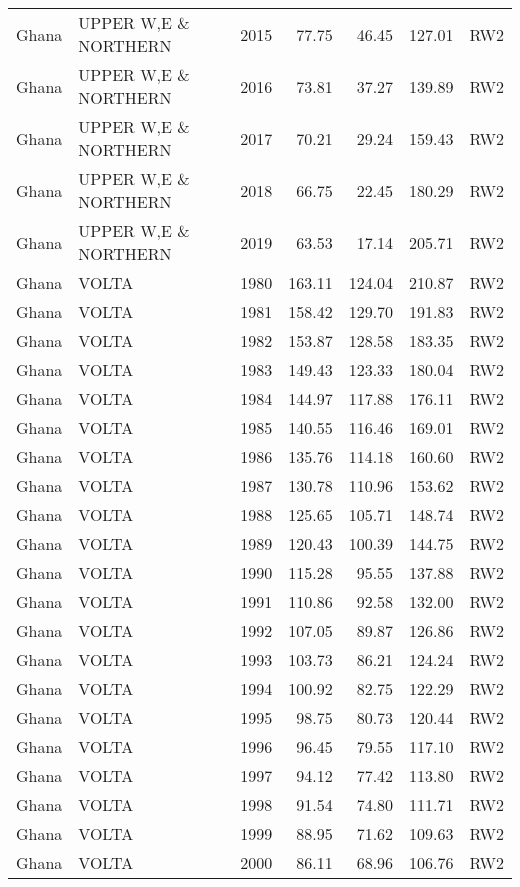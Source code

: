 \begin{longtable}{lllrrrl}
  Ghana & UPPER W,E \& NORTHERN & 2015 & 77.75 & 46.45 & 127.01 & RW2 \\ 
  Ghana & UPPER W,E \& NORTHERN & 2016 & 73.81 & 37.27 & 139.89 & RW2 \\ 
  Ghana & UPPER W,E \& NORTHERN & 2017 & 70.21 & 29.24 & 159.43 & RW2 \\ 
  Ghana & UPPER W,E \& NORTHERN & 2018 & 66.75 & 22.45 & 180.29 & RW2 \\ 
  Ghana & UPPER W,E \& NORTHERN & 2019 & 63.53 & 17.14 & 205.71 & RW2 \\ 
  Ghana & VOLTA & 1980 & 163.11 & 124.04 & 210.87 & RW2 \\ 
  Ghana & VOLTA & 1981 & 158.42 & 129.70 & 191.83 & RW2 \\ 
  Ghana & VOLTA & 1982 & 153.87 & 128.58 & 183.35 & RW2 \\ 
  Ghana & VOLTA & 1983 & 149.43 & 123.33 & 180.04 & RW2 \\ 
  Ghana & VOLTA & 1984 & 144.97 & 117.88 & 176.11 & RW2 \\ 
  Ghana & VOLTA & 1985 & 140.55 & 116.46 & 169.01 & RW2 \\ 
  Ghana & VOLTA & 1986 & 135.76 & 114.18 & 160.60 & RW2 \\ 
  Ghana & VOLTA & 1987 & 130.78 & 110.96 & 153.62 & RW2 \\ 
  Ghana & VOLTA & 1988 & 125.65 & 105.71 & 148.74 & RW2 \\ 
  Ghana & VOLTA & 1989 & 120.43 & 100.39 & 144.75 & RW2 \\ 
  Ghana & VOLTA & 1990 & 115.28 & 95.55 & 137.88 & RW2 \\ 
  Ghana & VOLTA & 1991 & 110.86 & 92.58 & 132.00 & RW2 \\ 
  Ghana & VOLTA & 1992 & 107.05 & 89.87 & 126.86 & RW2 \\ 
  Ghana & VOLTA & 1993 & 103.73 & 86.21 & 124.24 & RW2 \\ 
  Ghana & VOLTA & 1994 & 100.92 & 82.75 & 122.29 & RW2 \\ 
  Ghana & VOLTA & 1995 & 98.75 & 80.73 & 120.44 & RW2 \\ 
  Ghana & VOLTA & 1996 & 96.45 & 79.55 & 117.10 & RW2 \\ 
  Ghana & VOLTA & 1997 & 94.12 & 77.42 & 113.80 & RW2 \\ 
  Ghana & VOLTA & 1998 & 91.54 & 74.80 & 111.71 & RW2 \\ 
  Ghana & VOLTA & 1999 & 88.95 & 71.62 & 109.63 & RW2 \\ 
  Ghana & VOLTA & 2000 & 86.11 & 68.96 & 106.76 & RW2 \\ 

\end{longtable}
